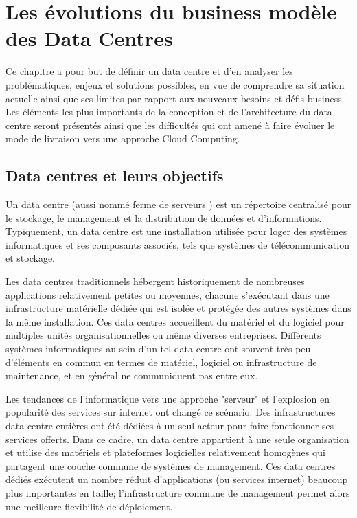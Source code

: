 
\chapter{Les évolutions du business modèle des Data Centres}
\label{chap-1}

Ce chapitre a pour but de définir un data centre et d'en analyser les problématiques, enjeux et solutions possibles, en vue de comprendre sa situation actuelle ainsi que ses limites par rapport aux nouveaux besoins et défis business. Les éléments les plus importants de la conception et de l'architecture du data centre seront présentés ainsi que les difficultés qui ont amené à faire évoluer le mode de livraison vers une approche Cloud Computing.

\section{Data centres et leurs objectifs}

Un data centre (aussi nommé \og ferme de serveurs \fg{}) est un répertoire centralisé pour le stockage, le management et la distribution de données et d'informations. Typiquement, un data centre est une installation utilisée pour loger des systèmes informatiques et ses composants associés, tels que systèmes de télécommunication et stockage. 

Les data centres traditionnels hébergent historiquement de nombreuses applications relativement petites ou moyennes, chacune s'exécutant dans une infrastructure matérielle dédiée qui est isolée et protégée des autres systèmes dans la même installation. Ces data centres accueillent du matériel et du logiciel pour multiples unités organisationnelles ou même diverses entreprises. Différents systèmes informatiques au sein d'un tel data centre ont souvent très peu d'éléments en commun en termes de matériel, logiciel ou infrastructure de maintenance, et en général ne communiquent pas entre eux. 


Les tendances de l'informatique vers une approche "serveur" et l'explosion en popularité des services sur internet ont changé ce scénario. Des infrastructures data centre entières ont été dédiées à un seul acteur pour faire fonctionner ses services offerts. Dans ce cadre, un data centre appartient à une seule organisation et utilise des matériels et plateformes logicielles relativement homogènes qui partagent une couche commune de systèmes de management. Ces data centres dédiés exécutent un nombre réduit d'applications (ou services internet) beaucoup plus importantes en taille; l'infrastructure commune de management permet alors une meilleure flexibilité de déploiement. 

